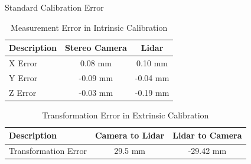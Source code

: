 \documentclass[10pt]{beamer}
\begin{document}
\begin{frame}{Standard Calibration Error}
\begin{table}
    \centering
    \begin{tabular}{|l|c|c|}
        \hline
        Description & Stereo Camera & Lidar \\
        \hline
        X Error & 0.08 mm & 0.10 mm \\
        \hline
        Y Error & -0.09 mm & -0.04 mm \\ 
        \hline
        Z Error & -0.03 mm  & -0.19 mm \\
        \hline
    \end{tabular}
    \caption{Measurement Error in Intrinsic Calibration}
\end{table}

\begin{table}
    \centering
    \begin{tabular}{|l|c|c|}
        \hline
        Description & Camera to Lidar & Lidar to Camera \\
        \hline
        Transformation Error & 29.5 mm & -29.42 mm \\
        \hline
    \end{tabular}
    \caption{Transformation Error in Extrinsic Calibration}
\end{table}
\end{frame}
\end{document}
